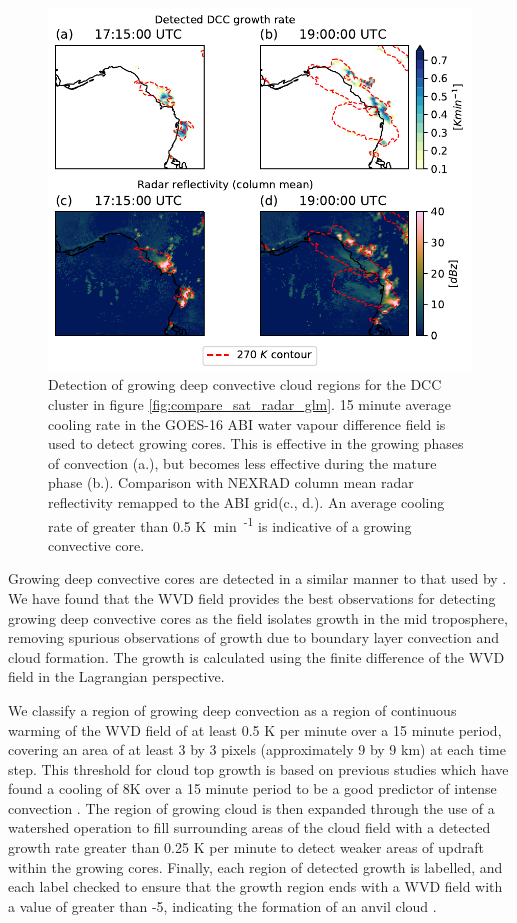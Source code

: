\documentclass[amt, manuscript]{copernicus}
\begin{document}
\begin{figure}[t]
    \includegraphics[width=12cm]{figure06.pdf}
    \caption{Detection of growing deep convective cloud regions for the DCC cluster in figure \ref{fig:compare_sat_radar_glm}. 15 minute average cooling rate in the GOES-16 ABI water vapour difference field is used to detect growing cores. This is effective in the growing phases of convection (a.), but becomes less effective during the mature phase (b.). Comparison with NEXRAD column mean radar reflectivity remapped to the ABI grid(c., d.). An average cooling rate of greater than 0.5 \unit{K min\textsuperscript{-1}} is indicative of a growing convective core.}
    \label{fig:core_detection}
\end{figure}

Growing deep convective cores are detected in a similar manner to that used by \citet{zinner_cb-tram:_2008}.
We have found that the WVD field provides the best observations for detecting growing deep convective cores as the field isolates growth in the mid troposphere, removing spurious observations of growth due to boundary layer convection and cloud formation.
The growth is calculated using the finite difference of the WVD field in the Lagrangian perspective.

We classify a region of growing deep convection as a region of continuous warming of the WVD field of at least 0.5 \unit{K} per minute over a 15 minute period, covering an area of at least 3 by 3 pixels (approximately 9 by 9 km) at each time step.
This threshold for cloud top growth is based on previous studies which have found a cooling of 8\unit{K} over a 15 minute period to be a good predictor of intense convection \citep{roberts_nowcasting_2003, hartung_intercomparison_2013}.
The region of growing cloud is then expanded through the use of a watershed operation to fill surrounding areas of the cloud field with a detected growth rate greater than 0.25 \unit{K} per minute to detect weaker areas of updraft within the growing cores.
Finally, each region of detected growth is labelled, and each label checked to ensure that the growth region ends with a WVD field with a value of greater than -5, indicating the formation of an anvil cloud \citep{muller_role_2018}.
\end{document}
